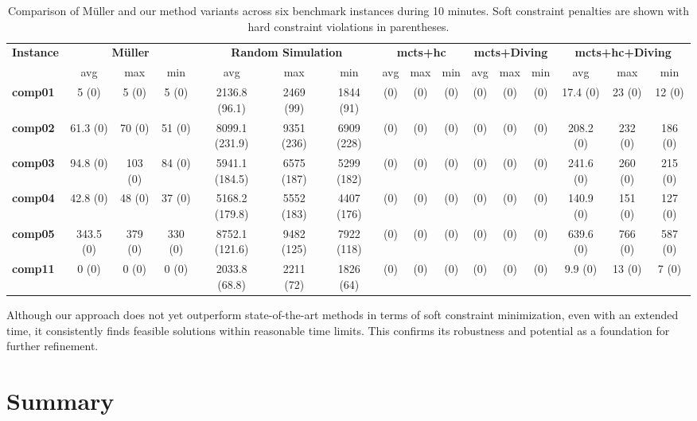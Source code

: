 \begin{sidewaystable}[p]
\centering
\setlength{\tabcolsep}{3pt}
\begin{tabular}{lccc|ccc|ccc|ccc|ccc}
\hline
\textbf{Instance}
& \multicolumn{3}{c|}{\textbf{Müller}} 
& \multicolumn{3}{c|}{\textbf{Random Simulation}} 
& \multicolumn{3}{c|}{\textbf{\ac{mcts}+\ac{hc}}} 
& \multicolumn{3}{c|}{\textbf{\ac{mcts}+Diving}} 
& \multicolumn{3}{c}{\textbf{\ac{mcts}+\ac{hc}+Diving}} \\
& avg & max & min 
& avg & max & min 
& avg & max & min 
& avg & max & min 
& avg & max & min \\
\hline
\textbf{comp01} & 5 (0) & 5 (0) & 5 (0) & 2136.8 (96.1) & 2469 (99) & 1844 (91) & (0) & (0) & (0) & (0) & (0) & (0) & 17.4 (0) & 23 (0) & 12 (0) \\
\textbf{comp02} & 61.3 (0) & 70 (0) & 51 (0) & 8099.1 (231.9) & 9351 (236) & 6909 (228) & (0) & (0) & (0) & (0) & (0) & (0) & 208.2 (0) & 232 (0) & 186 (0) \\
\textbf{comp03} & 94.8 (0) & 103 (0) & 84 (0) & 5941.1 (184.5) & 6575 (187) & 5299 (182) & (0) & (0) & (0) & (0) & (0) & (0) & 241.6 (0) & 260 (0) & 215 (0) \\
\textbf{comp04} & 42.8 (0) & 48 (0) & 37 (0) & 5168.2 (179.8) & 5552 (183) & 4407 (176) & (0) & (0) & (0) & (0) & (0) & (0) & 140.9 (0) & 151 (0) & 127 (0) \\
\textbf{comp05} & 343.5 (0) & 379 (0) & 330 (0) & 8752.1 (121.6) & 9482 (125) & 7922 (118) & (0) & (0) & (0) & (0) & (0) & (0) & 639.6 (0) & 766 (0) & 587 (0) \\
\textbf{comp11} & 0 (0) & 0 (0) & 0 (0) & 2033.8 (68.8) & 2211 (72) & 1826 (64) & (0) & (0) & (0) & (0) & (0) & (0) & 9.9 (0) & 13 (0) & 7 (0) \\
\hline
\end{tabular}
\caption{Comparison of Müller and our method variants across six benchmark instances during 10 minutes. Soft constraint penalties are shown with hard constraint violations in parentheses.}
\label{tab:comparison_results}
\end{sidewaystable}


Although our approach does not yet outperform state-of-the-art methods in terms of soft constraint minimization, even with an extended time, it consistently finds feasible solutions within reasonable time limits. This confirms its robustness and potential as a foundation for further refinement.

\section{Summary}

